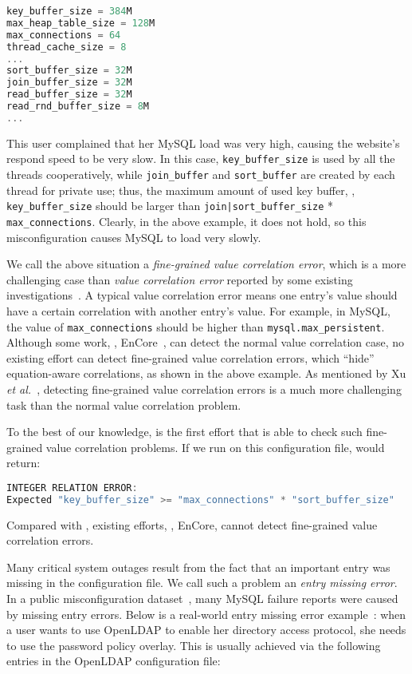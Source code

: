 \begin{lstlisting}[language=C, xleftmargin=.01\textwidth]
key_buffer_size = 384M
max_heap_table_size = 128M
max_connections = 64
thread_cache_size = 8
...
sort_buffer_size = 32M
join_buffer_size = 32M
read_buffer_size = 32M
read_rnd_buffer_size = 8M
...
\end{lstlisting} 

This user complained that her MySQL load was very high, causing the website's
respond speed to be very slow.
In this case, {\tt key\_buffer\_size} is used by all the threads
cooperatively, while {\tt join\_buffer} and {\tt sort\_buffer} are 
created by each thread for private use; thus, the maximum amount
of used key buffer, \ie, {\tt key\_buffer\_size} should be larger than 
{\tt join|sort\_buffer\_size} * {\tt max\_connections}. 
Clearly, in the above example, it does not hold, 
so this misconfiguration causes MySQL to load very slowly.

We call the above situation a {\em fine-grained value correlation
error}, which is a more challenging case than 
{\em value correlation error} reported
by some existing investigations~\cite{yin11anempirical, zhang14encore}.
A typical value correlation error
means one entry's value should have a certain correlation with
another entry's value. For example, in MySQL,
the value of {\tt max\_connections} should be higher than
{\tt mysql.max\_persistent}. Although some work, \eg,
EnCore~\cite{zhang14encore}, can detect the normal value
correlation case, 
no existing effort can detect fine-grained value correlation
errors, which ``hide'' equation-aware correlations, as shown in
the above example.
As mentioned by Xu {\em et al.}~\cite{xu15hey},
detecting fine-grained value correlation errors 
is a much more challenging
task than the normal value correlation problem.

To the best of our knowledge, \app is the first effort that
is able to check such fine-grained value correlation problems.
If we run \app on this configuration file, \app  would return:

\begin{lstlisting}[language=C, xleftmargin=.01\textwidth]
INTEGER RELATION ERROR:
Expected "key_buffer_size" >= "max_connections" * "sort_buffer_size"
\end{lstlisting} 

Compared with \app, existing efforts, \eg, EnCore, cannot 
detect fine-grained value correlation errors.

Many critical system outages result from the fact that an important
entry was missing in the configuration file. 
We call such a problem an {\em entry missing error}.
In a public misconfiguration dataset~\cite{configdataset},
many MySQL failure reports were caused by
missing entry errors.
Below is a real-world entry missing error example~\cite{yin11anempirical}:
when a user wants to use OpenLDAP to enable her directory access
protocol, she needs to use the password policy overlay. This is usually
achieved via the following entries in the OpenLDAP configuration file:

